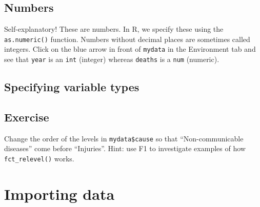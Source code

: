 \documentclass[]{book}
\makeatletter
\newenvironment{Shaded}{\begin{snugshade}}{\end{snugshade}}
\newcommand{\KeywordTok}[1]{\textcolor[rgb]{0.13,0.29,0.53}{\textbf{#1}}}
\newcommand{\StringTok}[1]{\textcolor[rgb]{0.31,0.60,0.02}{#1}}
\newcommand{\CommentTok}[1]{\textcolor[rgb]{0.56,0.35,0.01}{\textit{#1}}}
\newcommand{\OperatorTok}[1]{\textcolor[rgb]{0.81,0.36,0.00}{\textbf{#1}}}
\newcommand{\NormalTok}[1]{#1}
\newenvironment{kframe}{%
\medskip{}
\setlength{\fboxsep}{.8em}
 \def\at@end@of@kframe{}%
 \ifinner\ifhmode%
  \def\at@end@of@kframe{\end{minipage}}%
  \begin{minipage}{\columnwidth}%
 \fi\fi%
 \def\FrameCommand##1{\hskip\@totalleftmargin \hskip-\fboxsep
 \colorbox{shadecolor}{##1}\hskip-\fboxsep
     \hskip-\linewidth \hskip-\@totalleftmargin \hskip\columnwidth}%
 \MakeFramed {\advance\hsize-\width
   \@totalleftmargin\z@ \linewidth\hsize
   \@setminipage}}%
 {\par\unskip\endMakeFramed%
 \at@end@of@kframe}
\renewenvironment{Shaded}{\begin{kframe}}{\end{kframe}}
\theoremstyle{definition}
\theoremstyle{definition}
\theoremstyle{definition}
\theoremstyle{remark}
\makeatother
\begin{document}
\subsection{Numbers}\label{numbers}

Self-explanatory! These are numbers. In R, we specify these using the
\texttt{as.numeric()} function. Numbers without decimal places are
sometimes called integers. Click on the blue arrow in front of
\texttt{mydata} in the Environment tab and see that \texttt{year} is an
\texttt{int} (integer) whereas \texttt{deaths} is a \texttt{num}
(numeric).

\subsection{Specifying variable types}\label{specifying-variable-types}

\begin{Shaded}
\end{Shaded}

\subsection{Exercise}\label{exercise-9}

Change the order of the levels in \texttt{mydata\$cause} so that
``Non-communicable diseases'' come before ``Injuries''. Hint: use F1 to
investigate examples of how \texttt{fct\_relevel()} works.

\section{Importing data}\label{importing-data}
\end{document}

